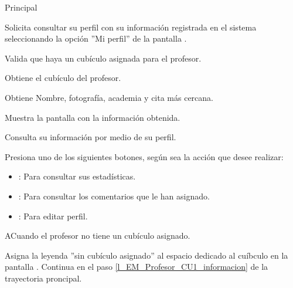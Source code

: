 \begin{UCtrayectoria}{Principal}
	
	\UCpaso [\UCactor] Solicita consultar su perfil con su información registrada en el sistema seleccionando la opción ''Mi perfil'' de la pantalla .

	\UCpaso Valida que haya un cubículo asignada para el profesor.

	\UCpaso Obtiene el cubículo del profesor.  

	\UCpaso Obtiene Nombre, fotografía, academia y cita más cercana. \label{l_EM_Profesor_CU1_informacion}

	\UCpaso Muestra la pantalla  con la información obtenida.

	\UCpaso[\UCactor] Consulta su información por medio de su perfil.

	\UCpaso [\UCactor] Presiona uno de los siguientes botones, según sea la acción que desee realizar: 
	\begin{itemize}
		\item {}: Para consultar sus estadísticas.
		\item {}: Para consultar los comentarios que le han asignado.
		\item {}: Para editar perfil.  
	\end{itemize}

\end{UCtrayectoria}

\begin{UCtrayectoriaA}{A}{Cuando el profesor no tiene un cubículo asignado.}

	\UCpaso	Asigna la leyenda ''sin cubículo asignado'' al espacio dedicado al cuíbculo en la pantalla .
	\UCpaso Continua en el paso \ref{l_EM_Profesor_CU1_informacion} de la trayectoria proncipal.

\end{UCtrayectoriaA}
